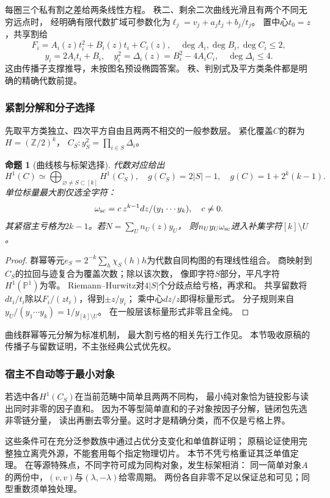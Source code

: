 \documentclass[11pt,a4paper,oneside]{ctexart}
\theoremstyle{cnplain}
\newtheorem{proposition}[theorem]{命题}
\theoremstyle{definition}
\theoremstyle{remark}
\numberwithin{equation}{section}
\begin{document}
每圈三个私有割之差给两条线性方程。
秩二、剩余二次曲线光滑且有两个不同无穷远点时，
经明确有限代数扩域可参数化为$\ell_j=v_j+a_jt_j+b_j/t_j$。
置中心$t_0=z$，共享割给
\[
 F_i=A_i(z)t_i^2+B_i(z)t_i+C_i(z),\quad
 \deg A_i,\deg B_i,\deg C_i\leq2,
\]
\[
 y_i=2A_it_i+B_i,\quad y_i^2=\Delta_i(z)=B_i^2-4A_iC_i,\quad
 \deg\Delta_i\leq4.
\]
这由传播子支撑推导，未按图名预设椭圆答案。
秩、判别式及平方类条件都是明确的精确代数前提。

\subsubsection{紧割分解和分子选择}
先取平方类独立、四次平方自由且两两不相交的一般参数层。
紧化覆盖$C$的群为$H=(\mathbb Z/2)^k$，
$C_S:y_S^2=\prod_{i\in S}\Delta_i$。

\begin{proposition}[曲线核与标架选择]\label{unified:prop:star}
代数对应给出
\[
 H^1(C)\simeq\bigoplus_{\varnothing\ne S\subset[k]}H^1(C_S),
 \quad g(C_S)=2|S|-1,\quad g(C)=1+2^k(k-1).
\]
单位标量最大割仅选全字符：
\[
 \omega_{\rm sc}=c\,z^{k-1}dz/(y_1\cdots y_k),\quad c\ne0.
\]
其紧宿主亏格为$2k-1$。若$N=\sum_U n_U(z)y_U$，
则$n_Uy_U\omega_{\rm sc}$进入补集字符$[k]\setminus U$。
\end{proposition}
\begin{proof}
群幂等元$e_S=2^{-k}\sum_h\chi_S(h)h$为代数自同构图的有理线性组合。
商映射到$C_S$的拉回与迹复合为覆盖次数；除以该次数，
像即字符$S$部分，平凡字符$H^1(\mathbb P^1)$为零。
Riemann--Hurwitz对$4|S|$个分歧点给亏格，再求和。
共享留数将$dt_i/t_i$除以$F_i/(zt_i)$，得到$\pm z/y_i$；
乘中心$dz/z$即得标量形式。
分子规则来自$y_U/(y_1\cdots y_k)=1/y_{[k]\setminus U}$。
在一般层该标量形式非零且全纯。
\end{proof}
曲线群幂等元分解为标准机制\cite{KR}，
最大割亏格的相关先行工作见\cite{HHMZ}。
本节吸收原稿的传播子与留数证明，不主张经典公式优先权。

\subsubsection{宿主不自动等于最小对象}
若选中各$H^1(C_S)$在当前范畴中简单且两两不同构，
最小纯对象恰为链投影与读出同时非零的因子直和。
因为不等型简单直和的子对象按因子分解，链闭包先选非零链分量，
读出再删去零分量。这时才是精确分类，而不仅是亏格上界。

这些条件可在充分泛参数族中通过占优分支变化和单值群证明；
原稿论证使用完整独立离壳外源，不能套用每个指定物理切片。
本节不凭亏格重证其泛单值定理。
在等源特殊点，不同字符可成为同构对象，发生标架相消：
同一简单对象$A$的两份中，$(v,v)$与$(\lambda,-\lambda)$给零周期。
两份各自非零不足以保证总和可见；同型重数须单独处理。
\end{document}
